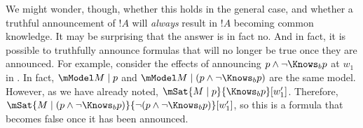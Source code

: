 \documentclass[../../../include/open-logic-section]{subfiles}
\begin{document}
We might wonder, though, whether this holds in the general case, and
whether a truthful announcement of $!A$ will \emph{always} result in
$!A$ becoming common knowledge. It may be surprising that the answer
is in fact no. And in fact, it is possible to truthfully announce
formulas that will no longer be true once they are announced. For
example, consider the effects of announcing $p \land \lnot \Knows_b p$
at $w_1$ in . In fact, $\mModel M \mid
p$ and $\mModel M \mid (p \land \lnot \Knows_b p)$ are the same model.
However, as we have already noted, $\mSat{M \mid p}{\Knows_b
p}[w'_1]$. Therefore, $\mSat{M \mid (p \land \lnot \Knows_b p)}{\lnot
(p \land \lnot \Knows_b p)}[w'_1]$, so this is a formula that becomes
false once it has been announced. 
\end{document}
